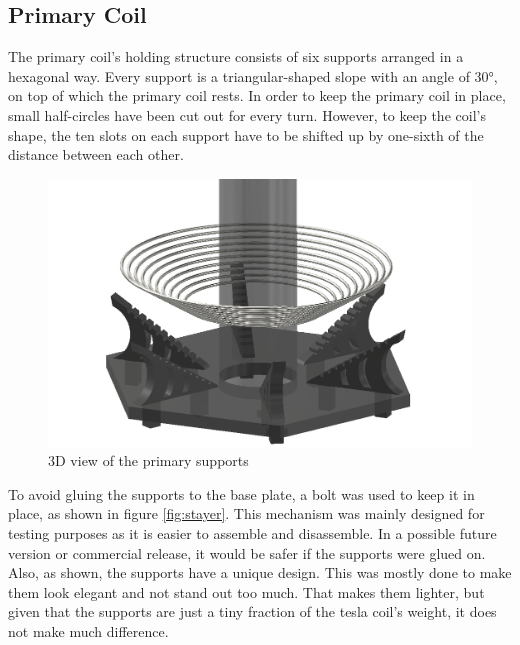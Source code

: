 \subsection{Primary Coil}

The primary coil's holding structure consists of six supports arranged in a hexagonal way. Every support is a triangular-shaped slope with an angle of 30°, on top of which the primary coil rests. In order to keep the primary coil in place, small half-circles have been cut out for every turn. However, to keep the coil's shape, the ten slots on each support have to be shifted up by one-sixth of the distance between each other.

\begin{figure}[h!]
    \centering
    \includegraphics[width=1\textwidth]{kassandra/resources/endeMeinerHoffnung.png}
    \caption{3D view of the primary supports}
    \label{fig:primary-supports}
\end{figure}

To avoid gluing the supports to the base plate, a bolt was used to keep it in place, as shown in figure \ref{fig:stayer}. This mechanism was mainly designed for testing purposes as it is easier to assemble and disassemble. In a possible future version or commercial release, it would be safer if the supports were glued on. Also, as shown, the supports have a unique design. This was mostly done to make them look elegant and not stand out too much. That makes them lighter, but given that the supports are just a tiny fraction of the tesla coil's weight, it does not make much difference.

